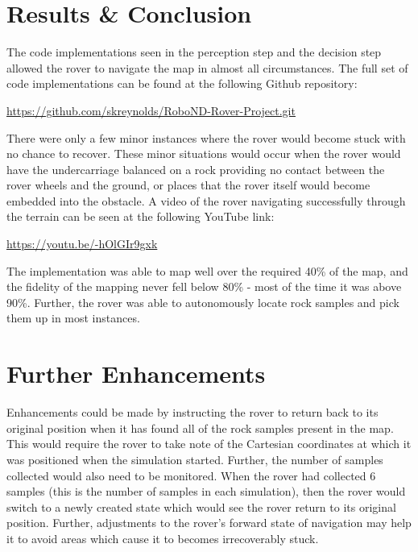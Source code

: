 \documentclass[a4paper]{article}
\begin{document}
\section{Results \& Conclusion}

The code implementations seen in the perception step and the decision step allowed the rover to navigate the map in almost all circumstances. The full set of code implementations can be found at the following Github repository:

\begin{center}
	\url{https://github.com/skreynolds/RoboND-Rover-Project.git}
\end{center}

There were only a few minor instances where the rover would become stuck with no chance to recover. These minor situations would occur when the rover would have the undercarriage balanced on a rock providing no contact between the rover wheels and the ground, or places that the rover itself would become embedded into the obstacle. A video of the rover navigating successfully through the terrain can be seen at the following YouTube link:

\begin{center}
	\url{https://youtu.be/-hOlGIr9gxk}
\end{center}

The implementation was able to map well over the required 40\% of the map, and the fidelity of the mapping never fell below 80\% - most of the time it was above 90\%. Further, the rover was able to autonomously locate rock samples and pick them up in most instances.

\newpage


\section{Further Enhancements}

Enhancements could be made by instructing the rover to return back to its original position when it has found all of the rock samples present in the map. This would require the rover to take note of the Cartesian coordinates at which it was positioned when the simulation started. Further, the number of samples collected would also need to be monitored. When the rover had collected 6 samples (this is the number of samples in each simulation), then the rover would switch to a newly created state which would see the rover return to its original position. Further, adjustments to the rover's forward state of navigation may help it to avoid areas which cause it to becomes irrecoverably stuck.
\end{document}
